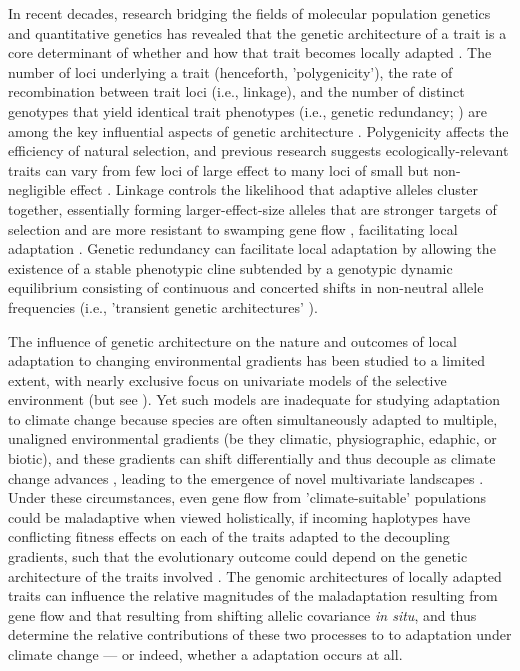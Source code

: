 \documentclass[9pt,twocolumn,twoside,lineno]{pnas-new}
\begin{document}
In recent decades, research bridging the fields
of molecular population genetics
and quantitative genetics
\cite{barghi_polygenic,barton,pritchard_human_adaptation,pritchard_sweeps_alone}
has revealed that the genetic architecture of a trait
is a core determinant of whether and how that trait
becomes locally adapted \cite{yeaman_review}.
The number of loci underlying a trait (henceforth, 'polygenicity'),
the rate of recombination between trait loci (i.e., linkage),
and the number of distinct genotypes that yield identical trait phenotypes
(i.e., genetic redundancy; \cite{yeaman_review,laruson,barghi_polygenic})
are among the key influential aspects of genetic architecture
\cite{barton,yeaman_whitlock,yeaman_review,lecorre}.
Polygenicity affects the efficiency of natural selection,
and previous research suggests ecologically-relevant traits can vary from
few loci of large effect
\cite{martin,rees}
to many loci of small but non-negligible effect
\cite{boyle,rockman,savolainen,sella,barghi_polygenic}.
Linkage controls the likelihood that adaptive alleles cluster together,
essentially forming larger-effect-size alleles that are stronger 
targets of selection and are more resistant
to swamping gene flow \cite{yeaman_whitlock},
facilitating local adaptation \cite{tigano}.
Genetic redundancy can facilitate local adaptation 
by allowing the existence of a stable phenotypic cline
subtended by a genotypic dynamic equilibrium
consisting of continuous and concerted shifts in non-neutral allele frequencies
(i.e., 'transient genetic architectures' \cite{barghi_redundancy,manceau,yeaman_amnat}).

The influence of genetic architecture on the nature and outcomes
of local adaptation to changing environmental gradients
has been studied to a limited extent,
with nearly exclusive focus on univariate models
of the selective environment (but see \cite{schiffers}).
Yet such models are inadequate for studying adaptation to climate change
because species are often simultaneously adapted to multiple, unaligned environmental gradients
(be they climatic, physiographic, edaphic, or biotic),
and these gradients can shift differentially and thus decouple as climate change advances
\cite{crimmins,daly},
leading to the emergence of novel multivariate landscapes
\cite{williams_novel_climates,williams_projected_novel_disappearing,fitzpatrick_climate_novelty_forecasts}.
Under these circumstances,
even gene flow from 'climate-suitable' populations
could be maladaptive when viewed holistically, if
incoming haplotypes have conflicting fitness effects
on each of the traits adapted to the decoupling gradients,
such that the evolutionary outcome could depend on
the genetic architecture of the traits involved
\cite{aitken_whitlock,schiffers}.
The genomic architectures of locally adapted traits
can influence the relative magnitudes of the maladaptation resulting from gene flow
and that resulting from shifting allelic covariance \textit{in situ},
and thus determine the relative contributions of these two processes to
to adaptation under climate change --- or indeed,
whether a adaptation occurs at all.
\end{document}

